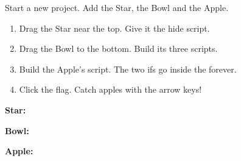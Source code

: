 \begin{exercise}
Start a new project. Add the Star, the Bowl and the Apple.
\begin{enumerate}[leftmargin=1.4em,itemsep=2pt]
  \item Drag the Star near the top. Give it the hide script.
  \item Drag the Bowl to the bottom. Build its three scripts.
  \item Build the Apple's script. The two ifs go inside the forever.
  \item Click the flag. Catch apples with the arrow keys!
\end{enumerate}
\begin{center}
\begin{minipage}[t]{0.4\linewidth}
\textbf{Star:}\par\smallskip
\begin{scratch}[scale=0.7]
\end{scratch}

\medskip
\textbf{Bowl:}\par\smallskip
\begin{scratch}[scale=0.7]
\end{scratch}

\smallskip
\begin{scratch}[scale=0.7]
\end{scratch}

\smallskip
\begin{scratch}[scale=0.7]
\end{scratch}
\end{minipage}\hfill
\begin{minipage}[t]{0.56\linewidth}
\textbf{Apple:}\par\smallskip
\begin{scratch}[scale=0.7]
\end{scratch}
\end{minipage}
\end{center}
\end{exercise}

